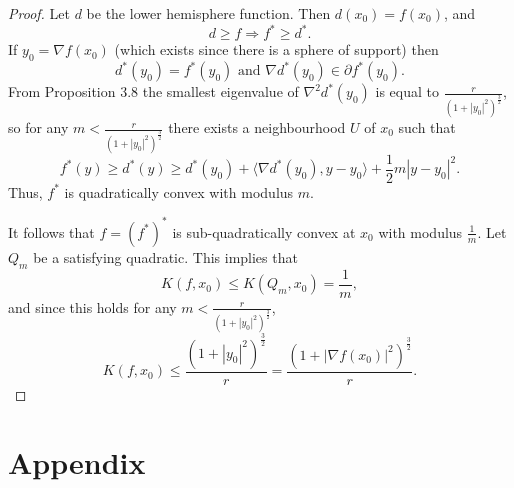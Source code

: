 \documentclass[10pt]{article}
\begin{document}
\begin{proof}
Let $d$ be the lower hemisphere function. Then $d(x_0)=f(x_0)$, and $$ d\geq f \Rightarrow f^*\geq d^*.$$ If $y_0=\nabla f(x_0)$ (which exists since there is a sphere of support) then $$d^*(y_0)=f^*(y_0) \text{ and } \nabla d^*(y_0)\in \partial f^*(y_0).$$ From Proposition 3.8 the smallest eigenvalue of $\nabla ^2 d^*(y_0)$ is equal to $\frac{r}{(1+|y_0|^2)^{\frac{3}{2}}}$, so for any $m < \frac{r}{(1+|y_0|^2)^{\frac{3}{2}}}$ there exists a neighbourhood $U$ of $x_0$ such that $$ f^*(y)\geq d^*(y)\geq d^*(y_0) + \langle \nabla d^*(y_0), y-y_0\rangle + \frac{1}{2} m|y-y_0|^2.$$ Thus, $f^*$ is quadratically convex with modulus $m$. 

It follows that $f= (f^*)^*$ is sub-quadratically convex at $x_0$ with modulus $\frac{1}{m}.$ Let $Q_m$ be a satisfying quadratic. This implies that 
$$K(f,x_0)\leq K(Q_m,x_0)=\frac{1}{m},$$ and since this holds for any $m< \frac{r}{(1+|y_0|^2)^{\frac{3}{2}}}$, $$K(f,x_0)\leq\frac{(1+|y_0|^2)^{\frac{3}{2}}}{r}=\frac{(1+|\nabla f(x_0)|^2)^{\frac{3}{2}}}{r}.$$
\end{proof}

\section{Appendix}
\end{document}
